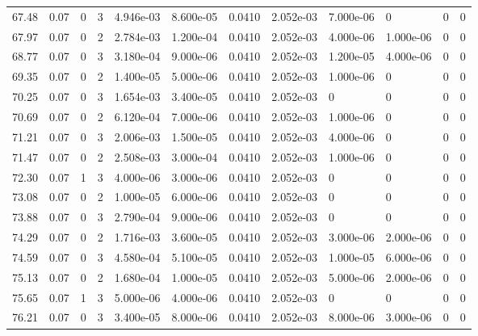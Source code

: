 \documentclass[preview]{standalone}
\begin{document}
{{{{\begin{tabular}{L{1.2cm}C{1.2cm} C{0.3cm}C{0.5cm} C{1.4cm}C{1.4cm} C{1.4cm}C{1.4cm} C{1.6cm}C{1.6cm} C{1.6cm}C{1.6cm}}
  67.48  &  0.07  & 0     &  3 &  4.946e-03  & 8.600e-05  &  0.0410&   2.052e-03& 7.000e-06 & 0   &  0 & 0  \\ 
  67.97  &  0.07  & 0     &  2 &  2.784e-03  & 1.200e-04  &  0.0410&   2.052e-03& 4.000e-06 & 1.000e-06   &  0 & 0  \\ 
  68.77  &  0.07  & 0     &  3 &  3.180e-04  & 9.000e-06  &  0.0410&   2.052e-03& 1.200e-05 & 4.000e-06   &  0 & 0  \\ 
  69.35  &  0.07  & 0     &  2 &  1.400e-05  & 5.000e-06  &  0.0410&   2.052e-03& 1.000e-06 & 0   &  0 & 0  \\ 
  70.25  &  0.07  & 0     &  3 &  1.654e-03  & 3.400e-05  &  0.0410&   2.052e-03& 0 & 0   &  0 & 0  \\ 
  70.69  &  0.07  & 0     &  2 &  6.120e-04  & 7.000e-06  &  0.0410&   2.052e-03& 1.000e-06 & 0   &  0 & 0  \\ 
  71.21  &  0.07  & 0     &  3 &  2.006e-03  & 1.500e-05  &  0.0410&   2.052e-03& 4.000e-06 & 0   &  0 & 0  \\ 
  71.47  &  0.07  & 0     &  2 &  2.508e-03  & 3.000e-04  &  0.0410&   2.052e-03& 1.000e-06 & 0   &  0 & 0  \\ 
  72.30  &  0.07  & 1     &  3 &  4.000e-06  & 3.000e-06  &  0.0410&   2.052e-03& 0 & 0   &  0 & 0  \\ 
  73.08  &  0.07  & 0     &  2 &  1.000e-05  & 6.000e-06  &  0.0410&   2.052e-03& 0 & 0   &  0 & 0  \\ 
  73.88  &  0.07  & 0     &  3 &  2.790e-04  & 9.000e-06  &  0.0410&   2.052e-03& 0 & 0   &  0 & 0  \\ 
  74.29  &  0.07  & 0     &  2 &  1.716e-03  & 3.600e-05  &  0.0410&   2.052e-03& 3.000e-06 & 2.000e-06   &  0 & 0  \\ 
  74.59  &  0.07  & 0     &  3 &  4.580e-04  & 5.100e-05  &  0.0410&   2.052e-03& 1.000e-05 & 6.000e-06   &  0 & 0  \\ 
  75.13  &  0.07  & 0     &  2 &  1.680e-04  & 1.000e-05  &  0.0410&   2.052e-03& 5.000e-06 & 2.000e-06   &  0 & 0  \\ 
  75.65  &  0.07  & 1     &  3 &  5.000e-06  & 4.000e-06  &  0.0410&   2.052e-03& 0 & 0   &  0 & 0  \\ 
  76.21  &  0.07  & 0     &  3 &  3.400e-05  & 8.000e-06  &  0.0410&   2.052e-03& 8.000e-06 & 3.000e-06   &  0 & 0  \\ 
\hline 
\end{tabular} 

}}}}
\end{document}
